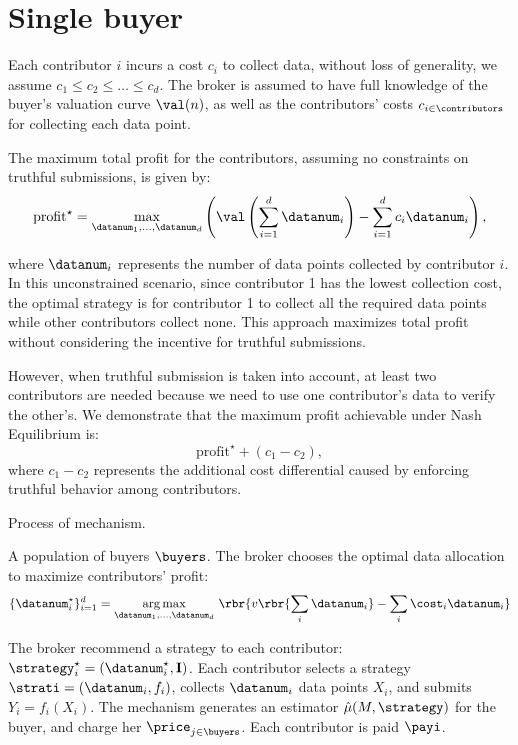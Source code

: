 \section{Single buyer} \label{section: singlebuyer}


Each contributor \( i \) incurs a cost \( c_i \) to collect data,  without loss of generality, we assume \( c_1 \leq c_2 \leq \dots \leq c_d \). The broker is assumed to have full knowledge of the buyer's valuation curve \( \val(n) \), as well as the contributors’ costs $ c_{ i \in \contributors}$  for collecting each data point.

The maximum total profit for the contributors, assuming no constraints on truthful submissions, is given by:
\[
\mathrm{profit}^\star = \underset{\datanum_1, \dots, \datanum_d}{\max} \left( \val \left(\sum_{i=1}^{d} \datanum_i\right) - \sum_{i=1}^{d} c_i \datanum_i \right),
\]

where \( \datanum_i \) represents the number of data points collected by contributor \( i \). In this unconstrained scenario, since contributor 1 has the lowest collection cost, the optimal strategy is for contributor 1 to collect all the required data points while other contributors collect none. This approach maximizes total profit without considering the incentive for truthful submissions.

However, when truthful submission is taken into account, at least two contributors are needed because we need to use one contributor's data to verify the other's. We demonstrate that the maximum profit achievable under Nash Equilibrium is:
\[
\mathrm{profit}^\star + (c_1 - c_2),
\]
where \( c_1 - c_2 \) represents the additional cost differential caused by enforcing truthful behavior among contributors. 

\begin{algorithm}[H]
    \caption{Process of mechanism.}
    \begin{algorithmic}
         A population of buyers $\buyers$.
        \STATE The broker chooses the optimal data allocation to maximize contributors' profit:
        $$
        \{ \datanum_i^{\star} \}_{i=1}^d = \underset{\datanum_1,\dots,\datanum_d}{\arg\max}\  \rbr{v\rbr{\sum_i \datanum_i}-\sum_i \cost_i \datanum_i  }
      $$
       
        \STATE The broker recommend a strategy to each contributor: $\strategy_i^{\star} = (\datanum_i^{\star}, \mathbf{I})$.
        \STATE Each contributor selects a strategy $\strati = (\datanum_i, f_i)$, collects $\datanum_i$ data points $X_i$, and submits $Y_i = f_i(X_i)$.
        \STATE The mechanism generates an estimator $\hat{\mu}(M,\strategy)$ for the buyer, and charge her $\price_{j \in \buyers}$. 
        \STATE Each contributor is paid $\payi$.    
    \end{algorithmic}   
\end{algorithm}




